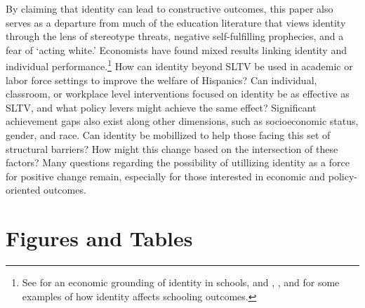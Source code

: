 \documentclass[11pt]{article}
\begin{document}
By claiming that identity can lead to constructive outcomes, this paper also serves as a departure from much of the education literature that views identity through the lens of stereotype threats, negative self-fulfilling prophecies, and a fear of `acting white.' Economists have found mixed results linking identity and individual performance.\footnote{ See \cite{akerlof2002identity} for an economic grounding of identity in schools, and \cite{fryer2010empirical}, \cite{deming2014school}, and \cite{gershenson2018long} for some examples of how identity affects schooling outcomes. } How can identity beyond SLTV be used in academic or labor force settings to improve the welfare of Hispanics? Can individual, classroom, or workplace level interventions focused on identity be as effective as SLTV, and what policy levers might achieve the same effect? Significant achievement gaps also exist along other dimensions, such as socioeconomic status, gender, and race. Can identity be mobillized to help those facing this set of structural barriers? How might this change based on the intersection of these factors?  Many questions regarding the possibility of utillizing identity as a force for positive change remain, especially for those interested in economic and policy-oriented outcomes. 


\clearpage
\pagebreak

\begin{singlespace}
\begin{scriptsize}

%
{}
\end{scriptsize}
\end{singlespace}

\pagebreak
\clearpage

\section*{Figures and Tables}



\end{document}
